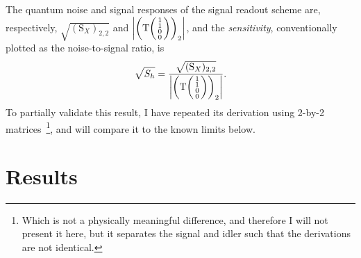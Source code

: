 The quantum noise and signal responses of the signal readout scheme are, respectively, $\sqrt{(\text{S}_X)_{2,2}}$ and $\abs{\left(\text{T}\begin{psmallmatrix}1 \\1\\0\\0\end{psmallmatrix}\right)_2}$, and the \emph{sensitivity}, conventionally plotted as the noise-to-signal ratio, is
\begin{equation}\label{eq:nIS_sigRO_sens}
\sqrt{S_h} = \frac{\sqrt{(\text{S}_X)_{2,2}}}{\abs{\left(\text{T}\begin{psmallmatrix}1 \\1\\0\\0\end{psmallmatrix}\right)_2}}.
\end{equation}
To partially validate this result, I have repeated its derivation using 2-by-2 matrices~\footnote{Which is not a physically meaningful difference, and therefore I will not present it here, but it separates the signal and idler such that the derivations are not identical.}, and will compare it to the known limits below. %


\section{Results}
\label{sec:nIS_sigRO_results}

